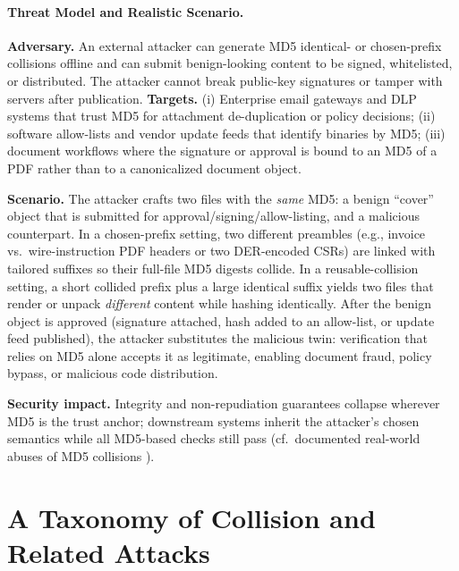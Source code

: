 \documentclass[runningheads]{llncs}
\begin{document}
    \paragraph{Threat Model and Realistic Scenario.}
    \textbf{Adversary.} An external attacker can generate MD5 identical- or chosen-prefix collisions offline and can submit benign-looking content to be signed, whitelisted, or distributed. The attacker cannot break public-key signatures or tamper with servers after publication. \textbf{Targets.} (i) Enterprise email gateways and DLP systems that trust MD5 for attachment de-duplication or policy decisions; (ii) software allow-lists and vendor update feeds that identify binaries by MD5; (iii) document workflows where the signature or approval is bound to an MD5 of a PDF rather than to a canonicalized document object.

    \textbf{Scenario.} The attacker crafts two files with the \emph{same} MD5: a benign “cover” object that is submitted for approval/signing/allow-listing, and a malicious counterpart. In a chosen-prefix setting, two different preambles (e.g., invoice vs.\ wire-instruction PDF headers or two DER-encoded CSRs) are linked with tailored suffixes so their full-file MD5 digests collide. In a reusable-collision setting, a short collided prefix plus a large identical suffix yields two files that render or unpack \emph{different} content while hashing identically. After the benign object is approved (signature attached, hash added to an allow-list, or update feed published), the attacker substitutes the malicious twin: verification that relies on MD5 alone accepts it as legitimate, enabling document fraud, policy bypass, or malicious code distribution.

    \textbf{Security impact.} Integrity and non-repudiation guarantees collapse wherever MD5 is the trust anchor; downstream systems inherit the attacker’s chosen semantics while all MD5-based checks still pass (cf.\ documented real-world abuses of MD5 collisions \cite{microsoft,stevens2009crypto}).


    \section{A Taxonomy of Collision and Related Attacks}
\end{document}
